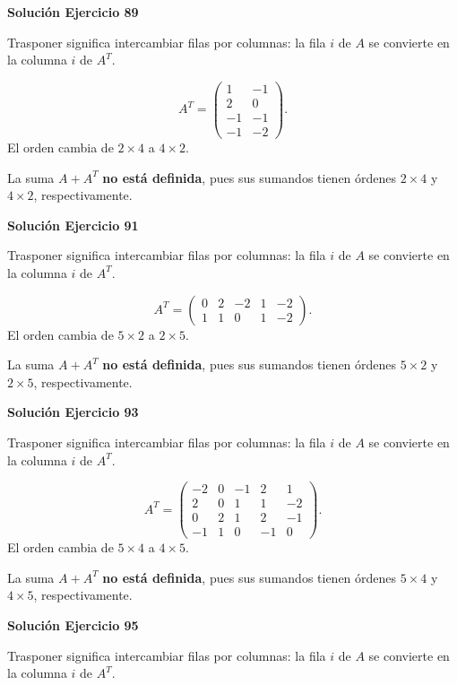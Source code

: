 \par\bigskip\noindent\textbf{Solución Ejercicio 89}\par\nobreak
Trasponer significa intercambiar filas por columnas: la fila $i$ de $A$ se convierte en la columna $i$ de $A^T$.

\[
A^T=\begin{pmatrix}1&-1\\2&0\\-1&-1\\-1&-2\end{pmatrix}.
\]
El orden cambia de $2\times4$ a $4\times2$.

La suma $A+A^T$ \textbf{no está definida}, pues sus sumandos tienen órdenes $2\times4$ y $4\times2$, respectivamente.


\par\bigskip\noindent\textbf{Solución Ejercicio 91}\par\nobreak
Trasponer significa intercambiar filas por columnas: la fila $i$ de $A$ se convierte en la columna $i$ de $A^T$.

\[
A^T=\begin{pmatrix}0&2&-2&1&-2\\1&1&0&1&-2\end{pmatrix}.
\]
El orden cambia de $5\times2$ a $2\times5$.

La suma $A+A^T$ \textbf{no está definida}, pues sus sumandos tienen órdenes $5\times2$ y $2\times5$, respectivamente.


\par\bigskip\noindent\textbf{Solución Ejercicio 93}\par\nobreak
Trasponer significa intercambiar filas por columnas: la fila $i$ de $A$ se convierte en la columna $i$ de $A^T$.

\[
A^T=\begin{pmatrix}-2&0&-1&2&1\\2&0&1&1&-2\\0&2&1&2&-1\\-1&1&0&-1&0\end{pmatrix}.
\]
El orden cambia de $5\times4$ a $4\times5$.

La suma $A+A^T$ \textbf{no está definida}, pues sus sumandos tienen órdenes $5\times4$ y $4\times5$, respectivamente.


\par\bigskip\noindent\textbf{Solución Ejercicio 95}\par\nobreak
Trasponer significa intercambiar filas por columnas: la fila $i$ de $A$ se convierte en la columna $i$ de $A^T$.

